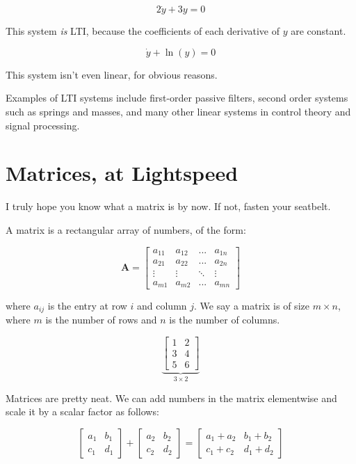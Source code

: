 \documentclass[
  letterpaper,
  DIV=11,
  numbers=noendperiod]{scrreprt}
\begin{document}
\[2 \dot{y} + 3 y = 0\]

This system \emph{is} LTI, because the coefficients of each derivative
of \(y\) are constant.

\[\dot{y} + \ln(y) = 0\]

This system isn't even linear, for obvious reasons.

Examples of LTI systems include first-order passive filters, second
order systems such as springs and masses, and many other linear systems
in control theory and signal processing.

\hypertarget{matrices-at-lightspeed}{%
\section{Matrices, at Lightspeed}\label{matrices-at-lightspeed}}

I truly hope you know what a matrix is by now. If not, fasten your
seatbelt.

A matrix is a rectangular array of numbers, of the form:

\[\textbf{A} = \begin{bmatrix}
    a_{11} & a_{12} & ... & a_{1n}\\ a_{21} & a_{22} & ... & a_{2n}\\ \vdots & \vdots & \ddots & \vdots \\ a_{m1} & a_{m2} & ... & a_{mn}
\end{bmatrix}\]

where \(a_{ij}\) is the entry at row \(i\) and column \(j\). We say a
matrix is of size \(m \times n\), where \(m\) is the number of rows and
\(n\) is the number of columns.

\[\underbrace{\begin{bmatrix}
    1 & 2 \\ 3 & 4 \\ 5 & 6
\end{bmatrix}
}_{3\times 2}\]

Matrices are pretty neat. We can add numbers in the matrix elementwise
and scale it by a scalar factor as follows:

\[\begin{bmatrix}
    a_1 & b_1 \\ c_1 & d_1
\end{bmatrix} + \begin{bmatrix}
    a_2 & b_2 \\ c_2 & d_2
\end{bmatrix} = \begin{bmatrix}
    a_1 + a_2 & b_1 + b_2 \\ c_1 + c_2 & d_1 + d_2
\end{bmatrix}\]
\end{document}
